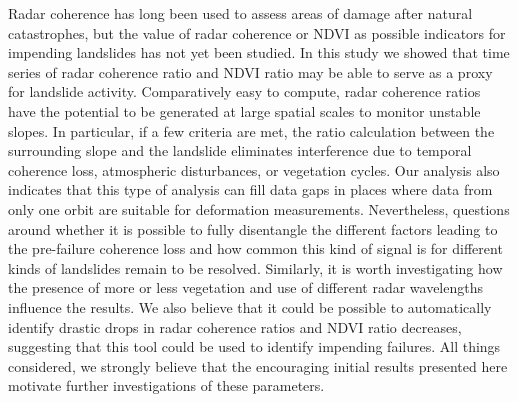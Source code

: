 \documentclass[nhess, manuscript]{copernicus}
\begin{document}
\conclusions  %
Radar coherence has long been used to assess areas of damage after natural catastrophes, but the value of radar coherence or NDVI as possible indicators for impending landslides has not yet been studied. In this study we showed that time series of radar coherence ratio and NDVI ratio may be able to serve as a proxy for landslide activity. Comparatively easy to compute, radar coherence ratios have the potential to be generated at large spatial scales to monitor unstable slopes. In particular, if a few criteria are met, the ratio calculation between the surrounding slope and the landslide eliminates interference due to temporal coherence loss, atmospheric disturbances, or vegetation cycles. Our analysis also indicates that this type of analysis can fill data gaps in places where data from only one orbit are suitable for deformation measurements. Nevertheless, questions around whether it is possible to fully disentangle the different factors leading to the pre-failure coherence loss and how common this kind of signal is for different kinds of landslides remain to be resolved. Similarly, it is worth investigating how the presence of more or less vegetation and use of different radar wavelengths influence the results. We also believe that it could be possible to automatically identify drastic drops in radar coherence ratios and NDVI ratio decreases, suggesting that this tool could be used to identify impending failures. All things considered, we strongly believe that the encouraging initial results presented here motivate further investigations of these parameters.










\end{document}
